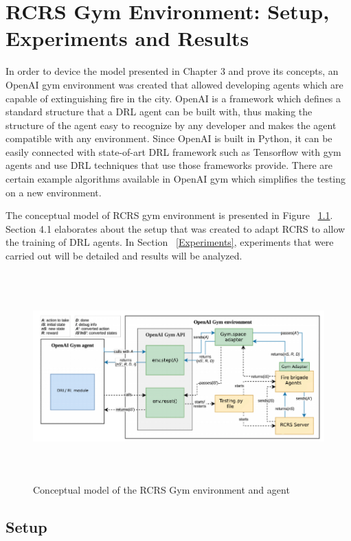 \documentclass[12pt]{report}
\begin{document}
\chapter{RCRS Gym Environment: Setup, Experiments and Results}

In order to device the model presented in Chapter 3 and prove its concepts, an OpenAI gym environment \cite{brockman2016openai} was created that allowed developing agents which are capable of extinguishing fire in the city. OpenAI is a framework which defines a standard structure that a DRL agent can be built with, thus making the structure of the agent easy to recognize by any developer and makes the agent compatible with any environment. Since OpenAI is built in Python, it can be easily connected with state-of-art DRL framework such as Tensorflow \cite{Abadi} with gym agents and use DRL techniques that use those frameworks provide. There are certain example algorithms available in OpenAI gym which simplifies the testing on a new environment. 

The conceptual model of RCRS gym environment is presented in Figure ~\ref{fig:OpenAIgymRCRS}. Section 4.1 elaborates about the setup that was created to adapt RCRS to allow the training of DRL agents. In Section ~\ref{Experiments}, experiments that were carried out will be detailed and results will be analyzed. 

\begin{figure}[!h]
    \centering
    \includegraphics[height=8cm, width=17cm]{OpenAIgymRCRS.png}
    \caption{Conceptual model of the RCRS Gym environment and agent}
    \label{fig:OpenAIgymRCRS}
\end{figure}

\section{Setup} \label{Setup}
\end{document}
